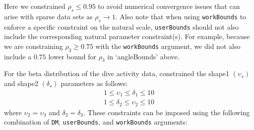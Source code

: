 \documentclass[12pt]{article}\usepackage[]{graphicx}\usepackage[]{color}
\begin{document}
Here we constrained $\rho_s \le 0.95$ to avoid numerical convergence issues that can arise with sparse data sets as $\rho_s \rightarrow 1$. Also note that when using \verb|workBounds| to enforce a specific constraint on the natural scale, \verb|userBounds| should not also include the corresponding natural parameter constraint(s). For example, because we are constraining $\rho_3 \ge 0.75$ with the \verb|workBounds| argument, we did not also include a $0.75$ lower bound for $\rho_3$ in `angleBounds' above.

For the beta distribution of the dive activity data, \cite{McClintockEtAl2013c} constrained the shape1 $(\upsilon_s)$ and shape2 $(\delta_s)$ parameters as follows:
\begin{eqnarray*}
1 \le \upsilon_1 \le \delta_1 \le 10 \\
1 \le \delta_2 \le \upsilon_2 \le 10
\end{eqnarray*}
where $\upsilon_2=\upsilon_3$ and $\delta_2=\delta_3$. These constraints can be imposed using the following combination of \verb|DM|, \verb|userBounds|, and \verb|workBounds| arguments:
\end{document}
